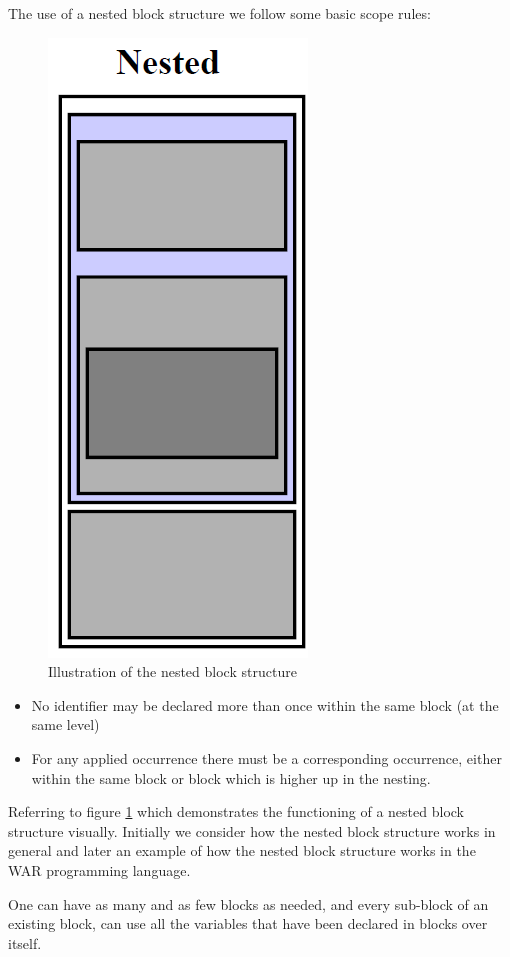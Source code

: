	The use of a nested block structure we follow some basic scope rules:
	\begin{figure}
		\begin{center}
			\includegraphics[scale=0.5]{rapport/5/figures/nested_block_structure}
		\end{center}	
		\caption{Illustration of the nested block structure}
		\label{nested_block_structure}
	\end{figure}


	\begin{itemize}
	\item No identifier may be declared more than once within the same block (at the same level) %
	\item For any applied occurrence there must be a corresponding occurrence, either within the same block or block which is higher up in the nesting. %
	\end{itemize}
	
	
	Referring to figure \ref{nested_block_structure} which demonstrates the functioning of a nested block structure visually. Initially we consider how the nested block structure works in general and later an example of how the nested block structure works in the WAR programming language.
	
	One can have as many and as few blocks as needed, and every sub-block of an existing block, can use all the variables that have been declared in blocks over itself. 
	
	
		
\newpage
	
	
